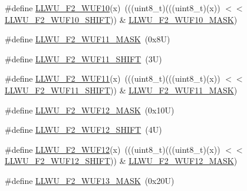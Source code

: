 \begin{DoxyCompactItemize}
\#define \mbox{\hyperlink{group___l_l_w_u___register___masks_ga1fbe79331ec3d400d836f9bb7de533a6}{L\+L\+W\+U\+\_\+\+F2\+\_\+\+W\+U\+F10}}(x)~(((uint8\+\_\+t)(((uint8\+\_\+t)(x)) $<$$<$ \mbox{\hyperlink{group___l_l_w_u___register___masks_ga0ac579128aa08740377c46fd52be2bb5}{L\+L\+W\+U\+\_\+\+F2\+\_\+\+W\+U\+F10\+\_\+\+S\+H\+I\+FT}})) \& \mbox{\hyperlink{group___l_l_w_u___register___masks_gae005607b6cb3ebf1a7def97cd8b2abc5}{L\+L\+W\+U\+\_\+\+F2\+\_\+\+W\+U\+F10\+\_\+\+M\+A\+SK}})
\item 
\#define \mbox{\hyperlink{group___l_l_w_u___register___masks_ga618834480f34a7997f2f4fab80d87400}{L\+L\+W\+U\+\_\+\+F2\+\_\+\+W\+U\+F11\+\_\+\+M\+A\+SK}}~(0x8\+U)
\item 
\#define \mbox{\hyperlink{group___l_l_w_u___register___masks_ga37c17efe2e5332ad92f9a05d9a15a2f2}{L\+L\+W\+U\+\_\+\+F2\+\_\+\+W\+U\+F11\+\_\+\+S\+H\+I\+FT}}~(3\+U)
\item 
\#define \mbox{\hyperlink{group___l_l_w_u___register___masks_ga8cff952a35e87f71a4b24ef6feefee82}{L\+L\+W\+U\+\_\+\+F2\+\_\+\+W\+U\+F11}}(x)~(((uint8\+\_\+t)(((uint8\+\_\+t)(x)) $<$$<$ \mbox{\hyperlink{group___l_l_w_u___register___masks_ga37c17efe2e5332ad92f9a05d9a15a2f2}{L\+L\+W\+U\+\_\+\+F2\+\_\+\+W\+U\+F11\+\_\+\+S\+H\+I\+FT}})) \& \mbox{\hyperlink{group___l_l_w_u___register___masks_ga618834480f34a7997f2f4fab80d87400}{L\+L\+W\+U\+\_\+\+F2\+\_\+\+W\+U\+F11\+\_\+\+M\+A\+SK}})
\item 
\#define \mbox{\hyperlink{group___l_l_w_u___register___masks_ga59dfa340c96f0c04fe3667e00dfb0575}{L\+L\+W\+U\+\_\+\+F2\+\_\+\+W\+U\+F12\+\_\+\+M\+A\+SK}}~(0x10\+U)
\item 
\#define \mbox{\hyperlink{group___l_l_w_u___register___masks_gae04234ed612320f80fe119820ae78e39}{L\+L\+W\+U\+\_\+\+F2\+\_\+\+W\+U\+F12\+\_\+\+S\+H\+I\+FT}}~(4\+U)
\item 
\#define \mbox{\hyperlink{group___l_l_w_u___register___masks_ga4b8f9110dc4fbd5597c179a2b819b946}{L\+L\+W\+U\+\_\+\+F2\+\_\+\+W\+U\+F12}}(x)~(((uint8\+\_\+t)(((uint8\+\_\+t)(x)) $<$$<$ \mbox{\hyperlink{group___l_l_w_u___register___masks_gae04234ed612320f80fe119820ae78e39}{L\+L\+W\+U\+\_\+\+F2\+\_\+\+W\+U\+F12\+\_\+\+S\+H\+I\+FT}})) \& \mbox{\hyperlink{group___l_l_w_u___register___masks_ga59dfa340c96f0c04fe3667e00dfb0575}{L\+L\+W\+U\+\_\+\+F2\+\_\+\+W\+U\+F12\+\_\+\+M\+A\+SK}})
\item 
\#define \mbox{\hyperlink{group___l_l_w_u___register___masks_ga6618b24b83e2e28d9268c1f5fac431af}{L\+L\+W\+U\+\_\+\+F2\+\_\+\+W\+U\+F13\+\_\+\+M\+A\+SK}}~(0x20\+U)
\item 
$$
\end{DoxyCompactItemize}

